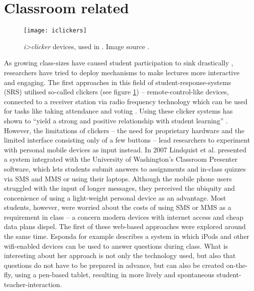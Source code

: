 \section{Classroom related}

\begin{figure}
\centering
\texttt{[image: iclickers]}
\caption{\emph{i>clicker} devices, used in \cite{Chamillard:StudentResponseSystem}. Image source \cite{iclicker}.}
\label{fig:related-work-iclicker}
\end{figure}

As growing class-sizes have caused student participation to sink drastically \cite{Bry:Backstage}, researchers have tried to deploy mechanisms to make lectures more interactive and engaging. The first ap\-proa\-ches in this field of student-response-systems (SRS) utilised so-called clickers (see figure \ref{fig:related-work-iclicker}) -- remote-control-like devices, connected to a receiver station via radio frequency technology \cite{cuclickers:faq} which can be used for tasks like taking attendance and voting \cite{Chamillard:StudentResponseSystem}. Using these clicker systems has shown to ``yield a strong and positive relationship with student learning'' \cite{Chamillard:StudentResponseSystem}. However, the limitations of clickers -- the need for proprietary hardware and the limited interface consisting only of a few buttons -- lead researchers to experiment with personal mobile devices as input instead. In 2007 Lindquist et al. \cite{Lindquist:ExploringMobilePhonesActiveLearning} presented a system integrated with the University of Washington's Classroom Presenter software, which lets students submit answers to assignments and in-class quizzes via SMS and MMS or using their laptops. Although the mobile phone users struggled with the input of longer messages, they perceived the ubiquity and concenience of using a light-weight personal device as an advantage. Most students, however, were worried about the costs of using SMS or MMS as a requirement in class -- a concern modern devices with internet access and cheap data plans dispel. The first of these web-based approaches were explored around the same time. Esponda \cite{Esponda:ElectronicVotingOnTheFly} for example describes a system in which iPods and other wifi-enabled devices can be used to answer questions during class. What is interesting about her approach is not only the technology used, but also that questions do not have to be prepared in advance, but can also be created on-the-fly, using a pen-based tablet, resulting in more lively and spontaneous student-teacher-interaction.
